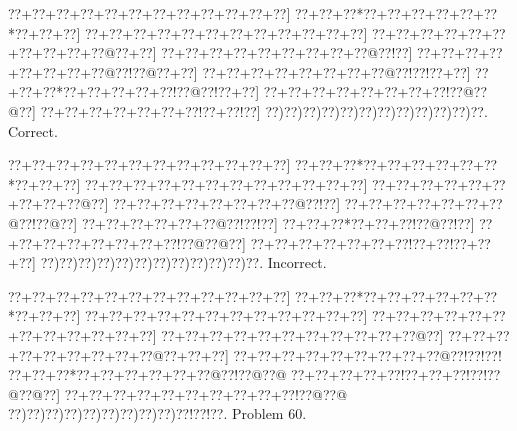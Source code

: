 \documentclass[a5paper]{article}
\begin{document}
\begin{center}
{\goo
\0??+\0??+\0??+\0??+\0??+\0??+\0??+\0??+\0??+\0??+\0??+\0??]
\0??+\0??+\0??*\0??+\0??+\0??+\0??+\0??+\0??*\0??+\0??+\0??]
\0??+\0??+\0??+\0??+\0??+\0??+\0??+\0??+\0??+\0??+\0??+\0??]
\0??+\0??+\0??+\0??+\0??+\0??+\0??+\0??+\0??+\0??@\0??+\0??]
\0??+\0??+\0??+\0??+\0??+\0??+\0??+\0??+\0??@\0??!\0??]
\0??+\0??+\0??+\0??+\0??+\0??+\0??+\0??@\0??!\0??@\0??+\0??]
\0??+\0??+\0??+\0??+\0??+\0??+\0??+\0??@\0??!\0??!\0??+\0??]
\0??+\0??+\0??*\0??+\0??+\0??+\0??+\0??!\0??@\0??!\0??+\0??]
\0??+\0??+\0??+\0??+\0??+\0??+\0??+\0??!\0??@\0??@\0??]
\0??+\0??+\0??+\0??+\0??+\0??+\0??!\0??+\0??!\0??]
\0??)\0??)\0??)\0??)\0??)\0??)\0??)\0??)\0??)\0??)\0??)\0??.
}
Correct. 

\end{center}
\begin{center}
{\goo
\0??+\0??+\0??+\0??+\0??+\0??+\0??+\0??+\0??+\0??+\0??+\0??]
\0??+\0??+\0??*\0??+\0??+\0??+\0??+\0??+\0??*\0??+\0??+\0??]
\0??+\0??+\0??+\0??+\0??+\0??+\0??+\0??+\0??+\0??+\0??+\0??]
\0??+\0??+\0??+\0??+\0??+\0??+\0??+\0??+\0??@\0??]
\0??+\0??+\0??+\0??+\0??+\0??+\0??+\0??@\0??!\0??]
\0??+\0??+\0??+\0??+\0??+\0??+\0??@\0??!\0??@\0??]
\0??+\0??+\0??+\0??+\0??+\0??@\0??!\0??!\0??]
\0??+\0??+\0??*\0??+\0??+\0??!\0??@\0??!\0??]
\0??+\0??+\0??+\0??+\0??+\0??+\0??+\0??!\0??@\0??@\0??]
\0??+\0??+\0??+\0??+\0??+\0??+\0??!\0??+\0??!\0??+\0??+\0??]
\0??)\0??)\0??)\0??)\0??)\0??)\0??)\0??)\0??)\0??)\0??)\0??.
}
Incorrect. 

\end{center}
\newpage
\begin{center}
{\goo
\0??+\0??+\0??+\0??+\0??+\0??+\0??+\0??+\0??+\0??+\0??+\0??]
\0??+\0??+\0??*\0??+\0??+\0??+\0??+\0??+\0??*\0??+\0??+\0??]
\0??+\0??+\0??+\0??+\0??+\0??+\0??+\0??+\0??+\0??+\0??+\0??]
\0??+\0??+\0??+\0??+\0??+\0??+\0??+\0??+\0??+\0??+\0??+\0??]
\0??+\0??+\0??+\0??+\0??+\0??+\0??+\0??+\0??+\0??+\0??@\0??]
\0??+\0??+\0??+\0??+\0??+\0??+\0??+\0??+\0??@\0??+\0??+\0??]
\0??+\0??+\0??+\0??+\0??+\0??+\0??+\0??+\0??@\0??!\0??!\0??!
\0??+\0??+\0??*\0??+\0??+\0??+\0??+\0??+\0??@\0??!\0??@\0??@
\0??+\0??+\0??+\0??+\0??!\0??+\0??+\0??!\0??!\0??@\0??@\0??]
\0??+\0??+\0??+\0??+\0??+\0??+\0??+\0??+\0??+\0??!\0??@\0??@
\0??)\0??)\0??)\0??)\0??)\0??)\0??)\0??)\0??)\0??!\0??!\0??.
}
Problem 60.

\end{center}
\end{document}
